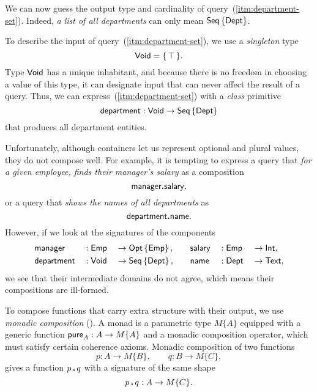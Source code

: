 We can now guess the output type and cardinality of
query~(\ref{itm:department-set}).  Indeed, \emph{a list of all departments}
can only mean $\textup{\textsf{Seq}}\left\{\textup{\textsf{Dept}}\right\}$.

To describe the input of query~(\ref{itm:department-set}), we use a
\emph{singleton} type
\begin{equation*}
    \textup{\textsf{Void}} = \{\, \top \,\}.
\end{equation*}
Type $\textup{\textsf{Void}}$ has a unique inhabitant, and because there is no freedom in
choosing a value of this type, it can designate input that can never affect the
result of a query.  Thus, we can express~(\ref{itm:department-set}) with a
\emph{class} primitive
\begin{equation*}
    \textup{\textsf{department}} : \textup{\textsf{Void}} \to \textup{\textsf{Seq}}\left\{\textup{\textsf{Dept}}\right\}
\end{equation*}
that produces all department entities.

Unfortunately, although containers let us represent optional and plural values,
they do not compose well.  For example, it is tempting to express a query that
\emph{for a given employee, finds their manager's salary} as a composition
\begin{equation} \label{eq:manager-to-salary}
    \textup{\textsf{manager}}\boldsymbol{.}\textup{\textsf{salary}},
\end{equation}
or a query that \emph{shows the names of all departments} as
\begin{equation} \label{eq:department-to-name}
    \textup{\textsf{department}}\boldsymbol{.}\textup{\textsf{name}}.
\end{equation}
However, if we look at the signatures of the components
\begin{alignat*}{6}
    & \textup{\textsf{manager}} && : \textup{\textsf{Emp}} && \to \textup{\textsf{Opt}}\left\{\textup{\textsf{Emp}}\right\}, \quad && \textup{\textsf{salary}} && : \textup{\textsf{Emp}} && \to \textup{\textsf{Int}}, \\
    & \textup{\textsf{department}} && : \textup{\textsf{Void}} && \to \textup{\textsf{Seq}}\left\{\textup{\textsf{Dept}}\right\}, \quad && \textup{\textsf{name}} && : \textup{\textsf{Dept}} && \to \textup{\textsf{Text}},
\end{alignat*}
we see that their intermediate domains do not agree, which means their
compositions are ill-formed.

To compose functions that carry extra structure with their output, we use
\emph{monadic composition} (\cite{Moggi1991}).  A mo\-nad is a parametric type
$M\{A\}$ equipped with a generic function $\textup{\textsf{pure}}_A : A \to M\{A\}$ and
a monadic composition operator, which must satisfy certain coherence axioms.
Monadic composition of two functions
\begin{equation*}
    p : A \to M\{B\}, \qquad q : B \to M\{C\},
\end{equation*}
gives a function $p\,\boldsymbol{.}\,q$ with a signature of the same shape
\begin{equation*}
    p\,\boldsymbol{.}\,q : A \to M\{C\}.
\end{equation*}

